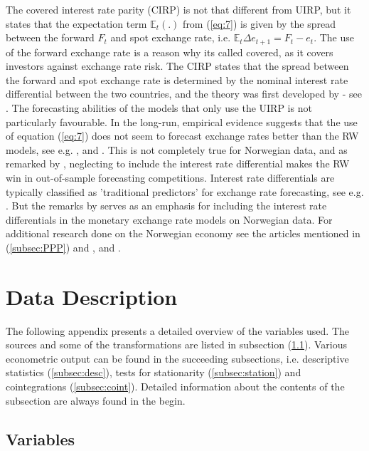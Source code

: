 \documentclass[10pt]{article}
\numberwithin{equation}{section}
\numberwithin{table}{section}
\numberwithin{figure}{section}
\begin{document}
\begin{spacing}{1.5}
\indent The covered interest rate parity (CIRP) is not that different from UIRP, but it states that the expectation term $\mathbb{E}_t\left(.\right)$ from (\ref{eq:7}) is given by the spread between the forward $F_{t}$ and spot exchange rate, i.e. $\mathbb{E}_t\Delta e_{t+1} = F_t - e_t$. The use of the forward exchange rate is a reason why its called covered, as it covers investors against exchange rate risk. The CIRP states that the spread between the forward and spot exchange rate is determined by the nominal interest rate differential between the two countries, and the theory was first developed by \cite{keynes1923tract} - see \cite{rossi2013exchange}. The forecasting abilities of the models that only use the UIRP is not particularly favourable. In the long-run, empirical evidence suggests that the use of equation (\ref{eq:7}) does not seem to forecast exchange rates better than the RW models, see e.g. \cite{meese1988real}, \cite{cheung2005empirical} and \cite{alquist2008conventional}. This is not completely true for Norwegian data, and as remarked by \cite{bjornland2006importance}, neglecting to include the interest rate differential makes the RW win in out-of-sample forecasting competitions. Interest rate differentials are typically classified as 'traditional predictors' for exchange rate forecasting, see e.g. \cite{rossi2013exchange}. But the remarks by \cite{bjornland2006importance} serves as an emphasis for including the interest rate differentials in the monetary exchange rate models on Norwegian data. For additional research done on the Norwegian economy see the articles mentioned in (\ref{subsec:PPP}) and \cite{flood2001uncovered}, \cite{chinn2006partial} and \cite{skinner2011covered}.\\
 
\newpage
\section{Data Description}
\label{app:2}

\noindent The following appendix presents a detailed overview of the variables used. The sources and some of the transformations are listed in subsection (\ref{subsec:vari}). Various econometric output can be found in the succeeding subsections, i.e. descriptive statistics (\ref{subsec:desc}), tests for stationarity (\ref{subsec:station}) and cointegrations (\ref{subsec:coint}). Detailed information about the contents of the subsection are always found in the begin. 

\subsection{Variables}
\label{subsec:vari}


\end{spacing}
\end{document}
